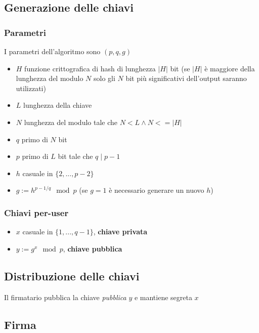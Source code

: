 \documentclass[14pt]{extarticle}
\begin{document}
    \subsection{Generazione delle chiavi}

    \subsubsection{Parametri}

    I parametri dell'algoritmo sono $(p, q, g)$

    \begin{itemize}
        \item $H$ funzione crittografica di hash di lunghezza $|H|$ bit (se $|H|$ è maggiore della lunghezza del modulo $N$ solo gli $N$ bit più significativi dell'output saranno utilizzati)
        \item $L$ lunghezza della chiave
        \item $N$ lunghezza del modulo tale che $N < L \wedge N <= |H| $
        \item $q$ primo di $N$ bit
        \item $p$ primo di $L$ bit tale che $q \mid p-1$
        \item $h$ casuale in $\{2, ..., p-2\}$
        \item $g := h^{{p-1}/q} \mod p$ (se $g=1$ è necessario generare un nuovo $h$)
    \end{itemize}

    \subsubsection{Chiavi per-user}

    \begin{itemize}
        \item $x$ casuale in $\{1, ..., q-1\}$, \textbf{chiave privata}
        \item $y := g^x \mod p$, \textbf{chiave pubblica}
    \end{itemize}

    \subsection{Distribuzione delle chiavi}

    Il firmatario pubblica la chiave \emph{pubblica} $y$ e mantiene segreta $x$

    \subsection{Firma}
\end{document}
